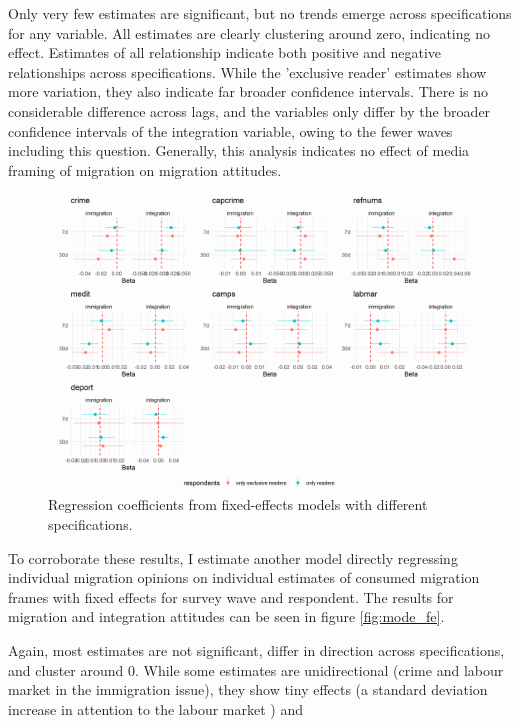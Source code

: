 \documentclass{article}
\begin{document}
Only very few estimates are significant, but no trends emerge across specifications for any variable. All estimates are clearly clustering around zero, indicating no effect. Estimates of all relationship indicate both positive and negative relationships across specifications. While the 'exclusive reader' estimates show more variation, they also indicate far broader confidence intervals. There is no considerable difference across lags, and the variables only differ by the broader confidence intervals of the integration variable, owing to the fewer waves including this question. Generally, this analysis indicates no effect of media framing of migration on migration attitudes.

\begin{figure}
    \centering
    \includegraphics[width=\textwidth]{paper/vis/effectplot_frames_fe_abs.png}
    \caption{Regression coefficients from fixed-effects models with different specifications.}
    \label{fig:model_fe}
\end{figure}

To corroborate these results, I estimate another model directly regressing individual migration opinions on individual estimates of consumed migration frames with fixed effects for survey wave and respondent. The results for migration and integration attitudes can be seen in figure \ref{fig:mode_fe}.

Again, most estimates are not significant, differ in direction across specifications, and cluster around 0. While some estimates are unidirectional (crime and labour market in the immigration issue), they show tiny effects (a standard deviation increase in attention to the labour market ) and 
\end{document}
